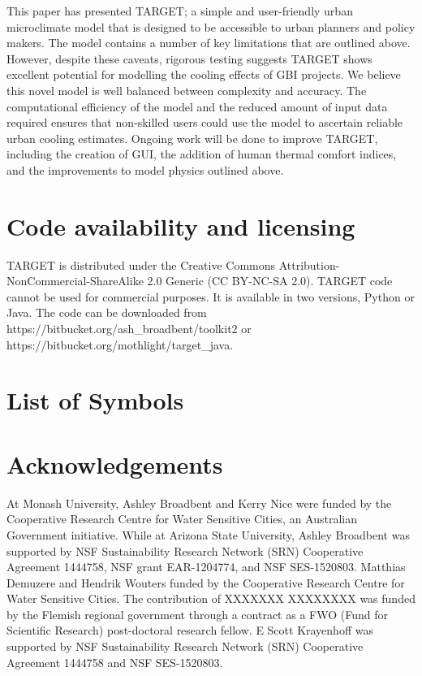 \documentclass[gmd, manuscript]{copernicus}
\begin{document}
This paper has presented TARGET; a simple and user-friendly urban microclimate model that is designed to be accessible to urban planners and policy makers. The model contains a number of key limitations that are outlined above. However, despite these caveats, rigorous testing suggests TARGET shows excellent potential for modelling the cooling effects of GBI projects. We believe this novel model is well balanced between  complexity and accuracy. The computational efficiency of the model and the reduced amount of input data required ensures that non-skilled users could use the model to ascertain reliable urban cooling estimates. Ongoing work will be done to improve TARGET, including the creation of GUI, the addition of human thermal comfort indices, and the improvements to model physics outlined above. 

\section{Code availability and licensing}

TARGET is distributed under the Creative Commons Attribution-NonCommercial-ShareAlike 2.0 Generic (CC BY-NC-SA 2.0). TARGET code cannot be used for commercial purposes. It is available in two versions, Python or Java. The code can be downloaded from https://bitbucket.org/ash\_broadbent/toolkit2 or  https://bitbucket.org/mothlight/target\_java.




\section{List of Symbols}\label{sec:symbollist}   



\section*{Acknowledgements}
At Monash University, Ashley Broadbent and Kerry Nice were funded by the Cooperative Research Centre for Water Sensitive Cities, an Australian Government initiative. While at Arizona State University, Ashley Broadbent was supported by NSF Sustainability Research Network (SRN) Cooperative Agreement 1444758,  NSF grant EAR-1204774, and NSF SES-1520803. Matthias Demuzere and Hendrik Wouters funded by the Cooperative Research Centre for Water Sensitive Cities. The contribution of XXXXXXX XXXXXXXX was funded by the Flemish regional government through a contract as a FWO (Fund for Scientific Research) post-doctoral research fellow. E Scott Krayenhoff  was supported by NSF Sustainability Research Network (SRN) Cooperative Agreement 1444758 and NSF SES-1520803. 
\end{document}

